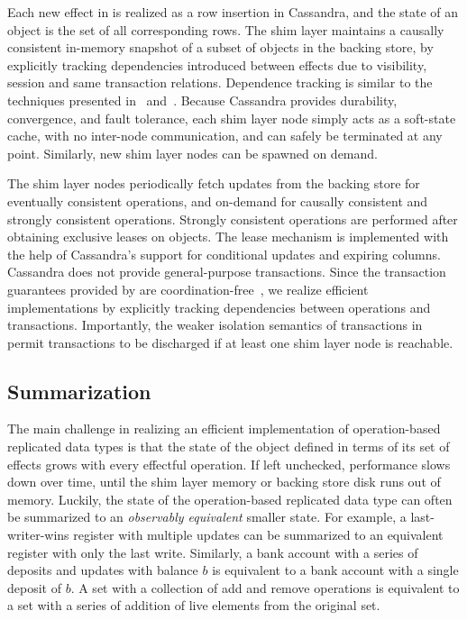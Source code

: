 Each new effect in \name is realized as a row insertion in Cassandra, and
the state of an object is the set of all corresponding rows. The shim layer
maintains a causally consistent in-memory snapshot of a subset of objects in
the backing store, by explicitly tracking dependencies introduced between
effects due to visibility, session and same transaction
relations. Dependence tracking is similar to the techniques presented
in~\cite{BoltOn} and~\cite{Eiger}. Because Cassandra provides durability,
convergence, and fault tolerance, each shim layer node simply acts as a
soft-state cache, with no inter-node communication, and can safely be
terminated at any point. Similarly, new shim layer nodes can be spawned on
demand.

The shim layer nodes periodically fetch updates from the backing store for
eventually consistent operations, and on-demand for causally consistent and
strongly consistent operations. Strongly consistent operations are performed
after obtaining exclusive leases on objects. The lease mechanism is
implemented with the help of Cassandra's support for conditional updates and
expiring columns. Cassandra does not provide general-purpose
transactions. Since the transaction guarantees provided by \name are
coordination-free~\cite{BailisHAT}, we realize efficient implementations by
explicitly tracking dependencies between operations and transactions.
Importantly, the weaker isolation semantics of transactions in \name permit
transactions to be discharged if at least one shim layer node is reachable.

\subsection{Summarization}

The main challenge in realizing an efficient implementation of operation-based
replicated data types is that the state of the object defined in terms of its
set of effects grows with every effectful operation. If left unchecked,
performance slows down over time, until the shim layer memory or backing store
disk runs out of memory. Luckily, the state of the operation-based replicated
data type can often be summarized to an \emph{observably equivalent} smaller
state. For example, a last-writer-wins register with multiple updates can be
summarized to an equivalent register with only the last write. Similarly, a
bank account with a series of deposits and updates with balance $b$ is
equivalent to a bank account with a single deposit of $b$. A set with a
collection of add and remove operations is equivalent to a set with a series of
addition of live elements from the original set.

